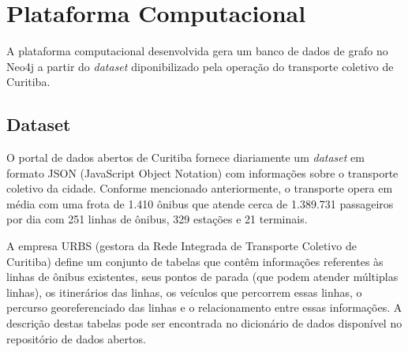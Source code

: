 \section{Plataforma Computacional} \label{sec:impl}

A plataforma computacional desenvolvida gera um banco de dados de grafo no Neo4j a partir do \emph{dataset} diponibilizado pela operação do transporte coletivo de Curitiba.





\subsection{Dataset}

O portal de dados abertos de Curitiba fornece diariamente um \emph{dataset} em formato JSON (JavaScript Object Notation) com informações sobre o transporte coletivo da cidade. Conforme mencionado anteriormente, o transporte opera em média com uma frota de 1.410 ônibus que atende cerca de 1.389.731 passageiros por dia com 251 linhas de ônibus, 329 estações e 21 terminais.

A empresa URBS (gestora da Rede Integrada de Transporte Coletivo de Curitiba) define um conjunto de tabelas que contêm informações referentes às linhas de ônibus existentes, seus pontos de parada (que podem atender múltiplas linhas), os itinerários das linhas, os veículos que percorrem essas linhas, o percurso georeferenciado das linhas e o relacionamento entre essas informações. A descrição destas tabelas pode ser encontrada no dicionário de dados disponível no repositório de dados abertos. 

